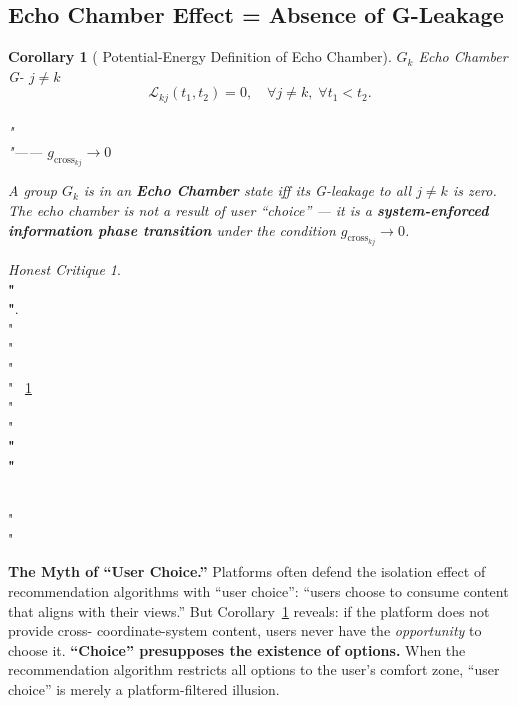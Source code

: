 \documentclass[11pt,a4paper]{article}
\newtheorem{corollary}[theorem]{Corollary}
\theoremstyle{remark}
\newtheorem{honestattack}{Honest Critique}
\newenvironment{attackbox}{%
  \begin{center}
  \color{red}
  \begin{minipage}{0.92\textwidth}
  \begin{honestattack}
}{%
  \end{honestattack}
  \end{minipage}
  \end{center}
}
\newcommand{\GCoupling}{g_{\text{cross}}}
\begin{document}
\subsection{Echo Chamber Effect = Absence of G-Leakage}

\begin{corollary}[ Potential-Energy Definition of Echo Chamber]
\label{cor:echochamber}
 $G_k$ \textbf{}Echo Chamber
G- $j \neq k$ 
\[
\mathcal{L}_{kj}(t_1, t_2) = 0, \quad \forall j \neq k, \; \forall t_1 < t_2.
\]
\\"\\"—— $\GCoupling_{kj} \to 0$ 
\textbf{}

A group $G_k$ is in an \textbf{Echo Chamber} state iff its G-leakage to all $j \neq k$
is zero. The echo chamber is not a result of user ``choice'' --- it is a
\textbf{system-enforced information phase transition} under the condition
$\GCoupling_{kj} \to 0$.
\end{corollary}

\begin{attackbox}
  \textbf{\\"\\"}.
  \\"\\"
  \\"\\"
  ~\ref{cor:echochamber} 
  \\"\\"
  \textbf{\\"\\"}
  
  \\"\\"

  \textbf{The Myth of ``User Choice.''}
  Platforms often defend the isolation effect of recommendation algorithms with ``user
  choice'': ``users choose to consume content that aligns with their views.'' But
  Corollary~\ref{cor:echochamber} reveals: if the platform does not provide cross-
  coordinate-system content, users never have the \textit{opportunity} to choose it.
  \textbf{``Choice'' presupposes the existence of options.}
  When the recommendation algorithm restricts all options to the user's comfort zone,
  ``user choice'' is merely a platform-filtered illusion.
\end{attackbox}

\end{document}
